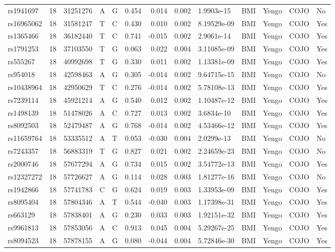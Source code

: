 \documentclass[11pt,twoside]{bristolthesis}
\begin{document}
\begin{longtable}[t]{lrlllrrrlllll}
rs1941697 & 18 & 31251276 & A & G & 0.454 & 0.014 & 0.002 & 1.9903e-15 & BMI & Yengo & COJO & No\\
rs16965062 & 18 & 31581247 & T & C & 0.430 & 0.010 & 0.002 & 8.19529e-09 & BMI & Yengo & COJO & Yes\\
rs1365466 & 18 & 36182440 & T & C & 0.741 & -0.015 & 0.002 & 2.9061e-14 & BMI & Yengo & COJO & Yes\\
\addlinespace
rs1791253 & 18 & 37103550 & T & G & 0.063 & 0.022 & 0.004 & 3.11085e-09 & BMI & Yengo & COJO & Yes\\
rs555267 & 18 & 40992698 & T & G & 0.330 & 0.011 & 0.002 & 1.13381e-09 & BMI & Yengo & COJO & Yes\\
rs954018 & 18 & 42598463 & A & G & 0.305 & -0.014 & 0.002 & 9.64715e-15 & BMI & Yengo & COJO & No\\
rs10438964 & 18 & 42950629 & T & C & 0.276 & -0.014 & 0.002 & 5.78108e-13 & BMI & Yengo & COJO & Yes\\
rs7239114 & 18 & 45921214 & A & G & 0.540 & 0.012 & 0.002 & 1.10487e-12 & BMI & Yengo & COJO & Yes\\
\addlinespace
rs1498139 & 18 & 51478026 & A & C & 0.727 & 0.013 & 0.002 & 3.6834e-10 & BMI & Yengo & COJO & Yes\\
rs8092503 & 18 & 52479487 & A & G & 0.768 & -0.014 & 0.002 & 4.53466e-12 & BMI & Yengo & COJO & Yes\\
rs11659764 & 18 & 53335512 & A & T & 0.053 & -0.030 & 0.004 & 2.0299e-13 & BMI & Yengo & COJO & No\\
rs7243357 & 18 & 56883319 & T & G & 0.827 & 0.021 & 0.002 & 2.24659e-23 & BMI & Yengo & COJO & No\\
rs2000746 & 18 & 57677294 & A & G & 0.734 & 0.015 & 0.002 & 3.54772e-13 & BMI & Yengo & COJO & Yes\\
\addlinespace
rs12327272 & 18 & 57726627 & A & G & 0.114 & 0.028 & 0.003 & 1.81277e-16 & BMI & Yengo & COJO & No\\
rs1942866 & 18 & 57741783 & C & G & 0.624 & 0.019 & 0.003 & 1.33953e-09 & BMI & Yengo & COJO & Yes\\
rs8095404 & 18 & 57804346 & A & T & 0.544 & -0.040 & 0.003 & 1.17398e-31 & BMI & Yengo & COJO & Yes\\
rs663129 & 18 & 57838401 & A & G & 0.230 & 0.033 & 0.003 & 1.92151e-32 & BMI & Yengo & COJO & Yes\\
rs9961813 & 18 & 57853056 & A & C & 0.913 & 0.045 & 0.004 & 5.29267e-25 & BMI & Yengo & COJO & Yes\\
\addlinespace
rs8094523 & 18 & 57878155 & A & G & 0.080 & -0.044 & 0.004 & 5.72846e-30 & BMI & Yengo & COJO & Yes\\

\end{longtable}
\end{document}

